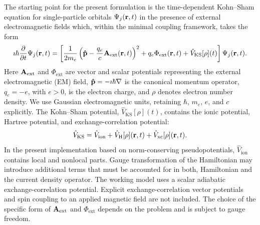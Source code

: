 The starting point for the present formulation is the time-dependent
Kohn--Sham equation for single-particle orbitals $\Psi_j(\vb r,t)$ in the
presence of external electromagnetic fields which, within the
minimal coupling framework, takes the form
\begin{equation}
 \imath\hbar\frac{\partial}{\partial t}\Psi_j(\vb r,t)
 =\left[
 \frac{1}{2m_e}
 \left(\vb{\hat p}-\frac{q_e}{c}\vb A_{\mathrm{ext}}(\vb r,t)\right)^2
 +q_e\Phi_{\mathrm{ext}}(\vb r,t)
 +\hat V_{\mathrm{KS}}[\rho](t)
 \right]\Psi_j(\vb r,t).
 \label{eq:em-tdks}
\end{equation}
Here $\vb A_{\mathrm{ext}}$ and $\Phi_{\mathrm{ext}}$ are vector and scalar
potentials representing the external electromagnetic (EM) field,
$\vb{\hat p}=-\imath\hbar\nabla$ is the canonical momentum operator,
 $q_e=-e$, with $e>0$, is the electron charge, and $\rho$ denotes electron number density.
We use Gaussian electromagnetic units, retaining $\hbar$, $m_e$, $e$,
and $c$ explicitly. 
The Kohn--Sham potential, $\hat V_{\mathrm{KS}}[\rho](t)$, contains the
ionic potential, Hartree potential, and exchange-correlation potential:
\begin{equation}
 \hat V_{\mathrm{KS}}
 =\hat V_{\mathrm{ion}}+\hat V_{\mathrm H}[\rho](\vb r,t)
 +\hat V_{\mathrm{xc}}[\rho](\vb r,t).
\end{equation}
In the present implementation based on norm-conserving
pseudopotentials, $\hat V_{\mathrm{ion}}$ contains local and
nonlocal parts. Gauge transformation of the Hamiltonian may introduce additional  terms 
that  must be accounted  for in both, Hamiltonian and  the current density 
operator.\cite{pickard-mauri-2001,Mattiat-Luber-2022,IsmailBeigi-2001-EM}
The working model uses a scalar adiabatic exchange-correlation
potential. Explicit exchange-correlation vector potentials and spin coupling
to an applied magnetic field are not included. 
The choice of the specific form of $\vb A_{\mathrm{ext}}$ and
$\Phi_{\mathrm{ext}}$ depends on the problem and is subject to gauge
freedom.\cite{gauge-theory}


